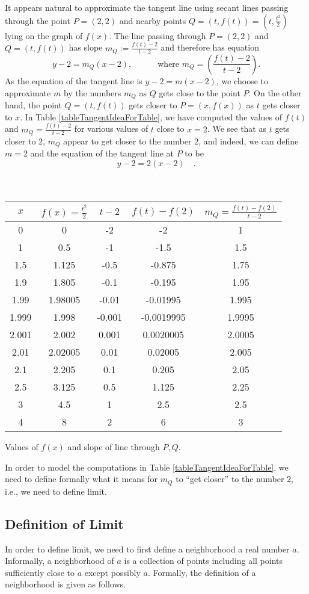 \documentclass[12pt]{book}
\newenvironment{tableFixed}{~\\~\medskip\begin{minipage}{\textwidth}\captionsetup{type=table} }{\medskip\end{minipage}\medskip }
\begin{document}
It appears natural to approximate the tangent line using secant lines passing through the point $ P=(2, 2)$ and nearby points $Q=(t,f(t))=(t, \frac{t^2}{2})$ lying on the graph of $f(x)$. The line passing through $P=(2,2) $ and $Q=(t,f(t))$ has slope $m_Q:=\frac{f(t)-2}{t-2}$ and therefore has equation
\[
y-2=m_Q(x-2), \quad\quad \quad\text{where~} m_Q= \left(\frac{f(t)-2}{t-2}\right).
\]
As the equation of the tangent line is $y-2=m(x-2)$, we choose to approximate $m$ by the numbers $m_Q$ as $Q$ gets close to the point $P$. On the other hand, the point $Q=(t,f(t))$ gets closer to $P= (x, f(x))$ as $t$ gets closer to $x$.
In Table \ref{tableTangentIdeaForTable}, we have computed the values of $f(t)$ and $m_Q=\frac{f(t)-2}{t-2}$ for various values of $t$ close to $x=2$. We see that as $t$ gets closer to $2$, $m_Q$ appear to get closer to the number $2$, and indeed, we can define $m=2$ and the equation of the tangent line at $P$ to be 
\[
y-2=2(x-2)\quad .
\]
\begin{tableFixed}
\begin{center}
\begin{tabular}{c|c|c|c|c}
$x$& $f(x)=\frac{t^2}2$& $t-2$ & $f(t)-f(2)$ & $m_Q=\frac{f(t)-f(2)}{t-2}$ \\\hline
0& 0& -2& -2& 1 \\
1& 0.5& -1& -1.5& 1.5 \\
1.5& 1.125& -0.5& -0.875& 1.75\\
1.9& 1.805& -0.1& -0.195& 1.95\\
1.99& 1.98005& -0.01& -0.01995& 1.995\\
1.999& 1.998& -0.001& -0.0019995& 1.9995\\\hline
2.001& 2.002& 0.001& 0.0020005& 2.0005\\
2.01& 2.02005& 0.01& 0.02005& 2.005\\
2.1& 2.205& 0.1& 0.205& 2.05\\
2.5& 3.125& 0.5& 1.125& 2.25\\
3& 4.5& 1& 2.5& 2.5\\
4& 8& 2& 6& 3 \\
\end{tabular}
\end{center}
\caption{ Values of $f(x)$ and slope of line through $P,Q$. \label{tableTangentIdeaForTable}}
\end{tableFixed}
In order to model the computations in Table \ref{tableTangentIdeaForTable}, we need to define formally what it means for $m_Q$ to ``get closer'' to the number $2$, i.e., we need to define limit.
\subsection{Definition of Limit}
In order to define limit, we need to first define a neighborhood a real number $a$. Informally, a neighborhood of $a$ is a collection of points including all points sufficiently close to $a$ except possibly $a$. Formally, the definition of a neighborhood is given as follows.
\end{document}
